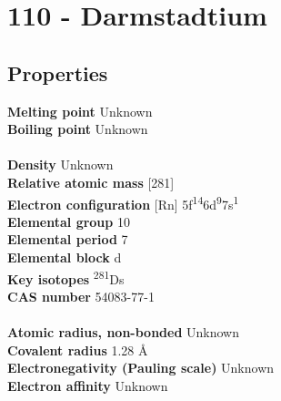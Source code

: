 \section{110 - Darmstadtium}
\label{sec:elem-darmstadtium}
\subsection{Properties}
\textbf{Melting point} Unknown\\
\textbf{Boiling point} Unknown\\
\\
\textbf{Density} Unknown\\
\textbf{Relative atomic mass} [281]\\
\textbf{Electron configuration} [Rn] 5f\textsuperscript{14}6d\textsuperscript{9}7s\textsuperscript{1}\\
\textbf{Elemental group} 10\\
\textbf{Elemental period} 7\\
\textbf{Elemental block} d\\
\textbf{Key isotopes} \textsuperscript{281}Ds\\
\textbf{CAS number} 54083-77-1\\
\\
\textbf{Atomic radius, non-bonded} Unknown\\
\textbf{Covalent radius} 1.28 Å\\
\textbf{Electronegativity (Pauling scale)} Unknown\\
\textbf{Electron affinity} Unknown\\